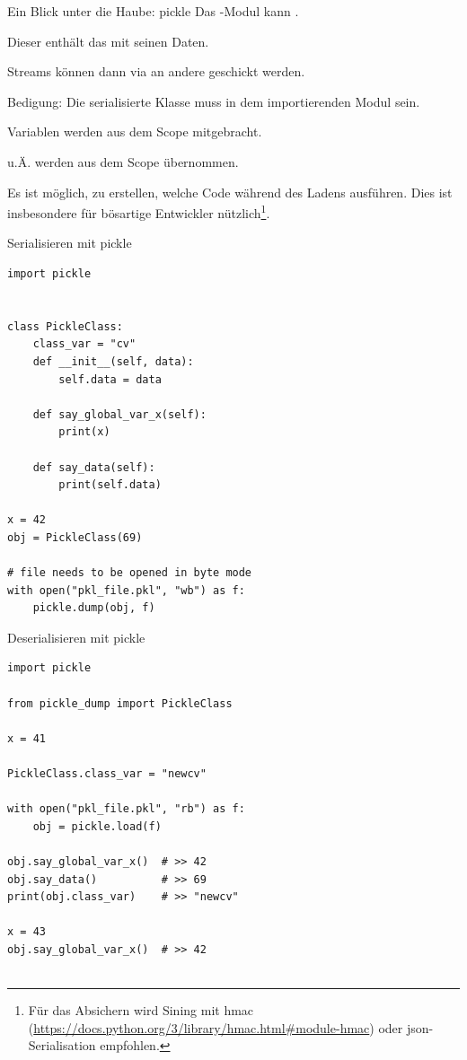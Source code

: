 \documentclass[12pt, aspectratio=169, usepdftitle=false, handout]{beamer}
\newcommand{\pp}[1]{\lpl{#1}}
\begin{document}
\begin{frame}[fragile]{Ein Blick unter die Haube: pickle}
        Das \pp{pickle}-Modul kann .

\pause
\medskip

Dieser enthält das  mit seinen Daten.

\pause
\medskip

Streams können dann via \pp{Pipe} an andere  geschickt werden.

\pause
\medskip

Bedigung: Die serialisierte Klasse muss in dem importierenden Modul  sein.

\medskip

 Variablen werden aus dem  Scope mitgebracht.

\medskip

 u.Ä. werden aus dem  Scope übernommen.

\pause
\medskip

Es ist möglich,  zu erstellen, welche  Code während des Ladens ausführen. Dies ist insbesondere für bösartige Entwickler nützlich\footnote{Für das Absichern wird Sining mit hmac (\url{https://docs.python.org/3/library/hmac.html\#module-hmac}) oder json-Serialisation empfohlen.}.

\end{frame}


\begin{frame}[fragile]{Serialisieren mit pickle}
	\begin{lstlisting}[language=pytiny]
import pickle


class PickleClass:
    class_var = "cv"
    def __init__(self, data):
        self.data = data

    def say_global_var_x(self):
        print(x)

    def say_data(self):
        print(self.data)

x = 42
obj = PickleClass(69)

# file needs to be opened in byte mode
with open("pkl_file.pkl", "wb") as f:
    pickle.dump(obj, f)		
	\end{lstlisting}
\end{frame}


\begin{frame}[fragile]{Deserialisieren mit pickle}
	\begin{lstlisting}[language=pytiny]
import pickle

from pickle_dump import PickleClass

x = 41

PickleClass.class_var = "newcv"

with open("pkl_file.pkl", "rb") as f:
    obj = pickle.load(f)

obj.say_global_var_x()  # >> 42
obj.say_data()          # >> 69
print(obj.class_var)    # >> "newcv"

x = 43
obj.say_global_var_x()  # >> 42
		
	\end{lstlisting}
\end{frame}
\end{document}
